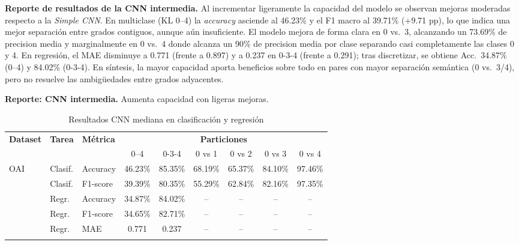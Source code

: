 \documentclass[11pt,spanish,listoffigures,listoftables]{tfgetsinf}
\begin{document}
\noindent\textbf{Reporte de resultados de la CNN intermedia.} Al incrementar ligeramente la capacidad del modelo se observan mejoras moderadas respecto a la \emph{Simple CNN}. En multiclase (KL 0--4) la \textit{accuracy} asciende al 46.23\%  y el F1 macro al 39.71\% (+9.71 pp), lo que indica una mejor separación entre grados contiguos, aunque aún insuficiente. El modelo mejora de forma clara en 0 vs.\ 3, alcanzando un 73.69\% de precision media y marginalmente en 0 vs.\ 4 donde alcanza un 90\% de precision media por clase separando casi completamente las clases 0 y 4. En regresión, el MAE disminuye a 0.771 (frente a 0.897) y a 0.237 en 0-3-4 (frente a 0.291); tras discretizar, se obtiene Acc.\ 34.87\% (0--4) y 84.02\% (0-3-4). En síntesis, la mayor capacidad aporta beneficios sobre todo en pares con mayor separación semántica (0 vs.\ 3/4), pero no resuelve las ambigüedades entre grados adyacentes.

\medskip
\noindent\textbf{Reporte: CNN intermedia.} Aumenta capacidad con ligeras mejoras.
\begin{table}[H]
	\centering
	\caption{Resultados CNN mediana en clasificación y regresión}
	\label{tab:cnn_mediana_results}
	\begin{tabular}{@{} l l l c c c c c c @{}}
		\toprule
		\textbf{Dataset} & \textbf{Tarea}                           & \textbf{Métrica}
		                 & \multicolumn{6}{c}{\textbf{Particiones}}                                                                                \\
		\cmidrule(lr){4-9}
		                 &                                          &                  & 0--4    & 0-3-4   & 0 vs 1  & 0 vs 2  & 0 vs 3  & 0 vs 4  \\
		\midrule
		\multirow{2}{*}{OAI}
		                 & Clasif.                                  & Accuracy         & 46.23\% & 85.35\% & 68.19\% & 65.37\% & 84.10\% & 97.46\% \\
		                 & Clasif.                                  & F1-score         & 39.39\% & 80.35\% & 55.29\% & 62.84\% & 82.16\% & 97.35\% \\
		\addlinespace
		\multirow{3}{*}{OAI}
		                 & Regr.                                    & Accuracy         & 34.87\% & 84.02\% & --      & --      & --      & --      \\
		                 & Regr.                                    & F1-score         & 34.65\% & 82.71\% & --      & --      & --      & --      \\
		                 & Regr.                                    & MAE              & 0.771   & 0.237   & --      & --      & --      & --      \\
		\addlinespace
	\end{tabular}
\end{table}
\end{document}

